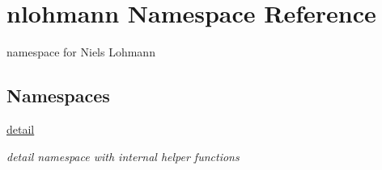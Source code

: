 \hypertarget{namespacenlohmann}{}\section{nlohmann Namespace Reference}
\label{namespacenlohmann}


namespace for Niels Lohmann  


\subsection*{Namespaces}
\begin{DoxyCompactItemize}
\item 
 \hyperlink{namespacenlohmann_1_1detail}{detail}
\begin{DoxyCompactList}\small\item\em detail namespace with internal helper functions \end{DoxyCompactList}\end{DoxyCompactItemize}
